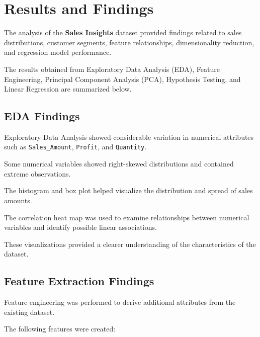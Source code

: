 \documentclass[12pt,a4paper]{report}
\begin{document}

\chapter{Results and Findings}

\begingroup
\fontsize{14}{21}\selectfont

The analysis of the \textbf{Sales Insights}
dataset provided findings related to
sales distributions, customer segments,
feature relationships, dimensionality
reduction, and regression model performance.

The results obtained from Exploratory
Data Analysis (EDA), Feature Engineering,
Principal Component Analysis (PCA),
Hypothesis Testing, and Linear Regression
are summarized below.


\section{EDA Findings}

Exploratory Data Analysis showed
considerable variation in numerical
attributes such as
\texttt{Sales\_Amount},
\texttt{Profit}, and
\texttt{Quantity}.

Some numerical variables showed
right-skewed distributions and
contained extreme observations.

The histogram and box plot
helped visualize the distribution
and spread of sales amounts.

The correlation heat map was
used to examine relationships
between numerical variables
and identify possible
linear associations.

These visualizations provided
a clearer understanding of
the characteristics of the dataset.


\section{Feature Extraction Findings}

Feature engineering was performed
to derive additional attributes
from the existing dataset.

The following features were created:
\end{document}
